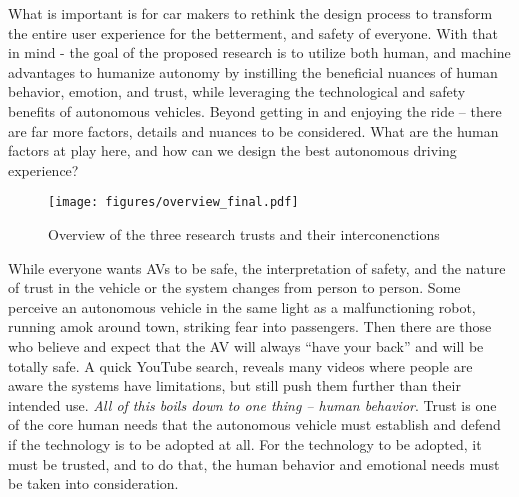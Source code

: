 What is important is for car makers to rethink the design process to transform the entire user experience for the betterment, and safety of everyone. 
With that in mind - the goal of the proposed research is to utilize both human, and machine advantages to humanize autonomy by instilling the beneficial nuances of human behavior, emotion, and trust, while leveraging the technological and safety benefits of autonomous vehicles.
Beyond getting in and enjoying the ride – there are far more factors, details and nuances to be considered. 
What are the human factors at play here, and how can we design the best autonomous driving experience?

\begin{figure}
    \centering
    \texttt{[image: figures/overview\_final.pdf]}
    \caption{Overview of the three research trusts and their interconenctions}
    \label{fig:overview}
\end{figure}



While everyone wants AVs to be safe, the interpretation of safety, and the nature of trust in the vehicle or the system changes from person to person.
Some perceive an autonomous vehicle in the same light as a malfunctioning robot, running amok around town, striking fear into passengers.
Then there are those who believe and expect that the AV will always ``have your back'' and will be totally safe.
A quick YouTube search, reveals many videos where people are aware the systems have limitations, but still push them further than their intended use. %
\textit{All of this boils down to one thing – human behavior}.
Trust is one of the core human needs that the autonomous vehicle must establish and defend if the technology is to be adopted at all.
For the technology to be adopted, it must be trusted, and to do that, the human behavior and emotional needs must be taken into consideration. 


